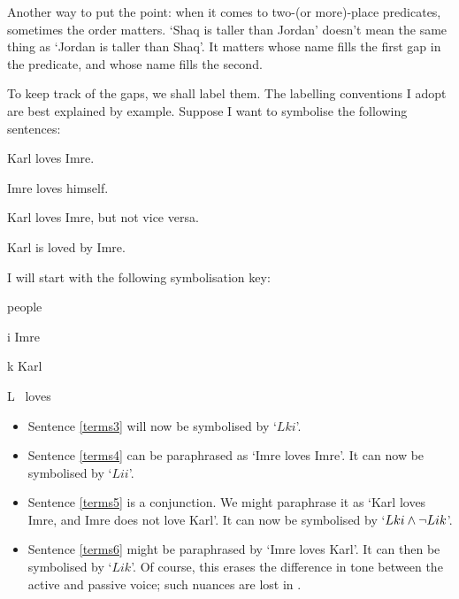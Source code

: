 Another way to put the point: when it comes to two-(or more)-place predicates, sometimes the order matters. `Shaq is taller than Jordan' doesn't mean the same thing as `Jordan is taller than Shaq'. It matters whose name fills the first gap in the predicate, and whose name fills the second. 

To keep track of the gaps, we shall label them. The labelling conventions I  adopt are best explained by example. Suppose I want to symbolise the following sentences:
	\begin{earg}
		\item[\ex{terms3}] Karl loves Imre.
		\item[\ex{terms4}] Imre loves himself.
		\item[\ex{terms5}] Karl loves Imre, but not vice versa.
		\item[\ex{terms6}] Karl is loved by Imre.
	\end{earg}
I will start with the following symbolisation key:
	\begin{ekey}
		\item[\text{domain}] people
		\item[i] Imre
		\item[k] Karl
		\item[L] \ loves 
	\end{ekey}
\begin{itemize}
	\item Sentence \ref{terms3} will now be symbolised by `$Lki$'. 
	\item Sentence \ref{terms4} can be paraphrased as `Imre loves Imre'. It can now be symbolised by `$Lii$'. 
\item Sentence \ref{terms5} is a conjunction. We might paraphrase it as `Karl loves Imre, and Imre does not love Karl'. It can now be symbolised by `$Lki \wedge \neg Lik$'. 
\item Sentence \ref{terms6} might be paraphrased by `Imre loves Karl'. It can then be symbolised by `$Lik$'. Of course, this erases the difference in tone between the active and passive voice; such nuances are lost in \FOL. 
\end{itemize}
